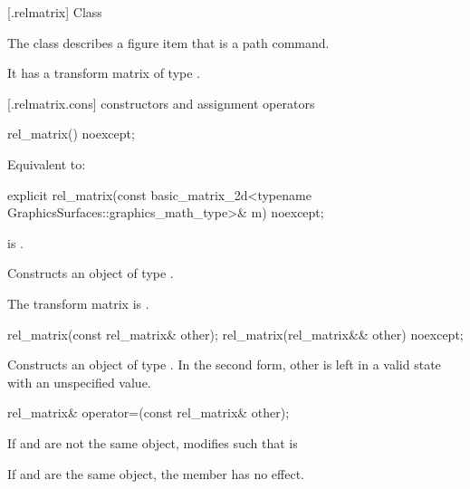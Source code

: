  [\iotwod.relmatrix] {Class }%

\pnum
{}%
The class  describes a figure item that is a path command.

\pnum
It has a transform matrix of type .

 [\iotwod.relmatrix.cons] { constructors and assignment operators}

%
\begin{itemdecl}
rel_matrix() noexcept;
\end{itemdecl}
\begin{itemdescr}
\pnum
\effects
Equivalent to: 
\end{itemdescr}

%
\begin{itemdecl}
explicit rel_matrix(const basic_matrix_2d<typename
  GraphicsSurfaces::graphics_math_type>& m) noexcept;
\end{itemdecl}
\begin{itemdescr}
\pnum
\requires
{} is .

\pnum
\effects
Constructs an object of type .

\pnum
The transform matrix is .
\end{itemdescr}

%
\begin{itemdecl}
rel_matrix(const rel_matrix& other);
rel_matrix(rel_matrix&& other) noexcept;
\end{itemdecl}
\begin{itemdescr}
\pnum
\effects
Constructs an object of type . In the second form, other is left in a valid state with an unspecified value.
\end{itemdescr}

%
\begin{itemdecl}
rel_matrix& operator=(const rel_matrix& other);
\end{itemdecl}
\begin{itemdescr}
\pnum
\effects
If  and  are not the same object, modifies  such that  is 

\pnum
If  and  are the same object, the member has no effect.

\pnum
\returns
{}
\end{itemdescr}

